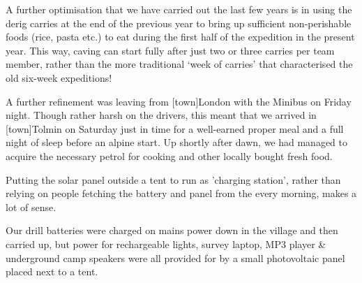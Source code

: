A further optimisation that we have carried out the last few years is in
using the derig carries at the end of the previous year to bring up
sufficient non-perishable foods (rice, pasta etc.) to eat during the
first half of the expedition in the present year. This way, caving can
start fully after just two or three carries per team member, rather than
the more traditional `week of carries' that characterised the old
six-week expeditions!

A further refinement was leaving from [town]London with the Minibus on Friday
night. Though rather harsh on the drivers, this meant that we arrived in
[town]Tolmin on Saturday just in time for a well-earned proper meal and a full
night of sleep before an alpine start. Up shortly after dawn, we had
managed to acquire the necessary petrol for cooking and other locally
bought fresh food.

\begin{marginfigure}
\checkoddpage \ifoddpage \forcerectofloat \else \forceversofloat \fi
\centering
 \caption{Putting the solar panel outside a tent to run as 'charging station', rather than relying on people fetching the battery and panel from the  every morning, makes a lot of sense. }
 \label{panel F10}
\end{marginfigure}

Our drill batteries were charged on mains power down in the village and
then carried up, but power for rechargeable lights, survey laptop, MP3
player \& underground camp speakers were all provided for by a small
photovoltaic panel placed next to a tent.




